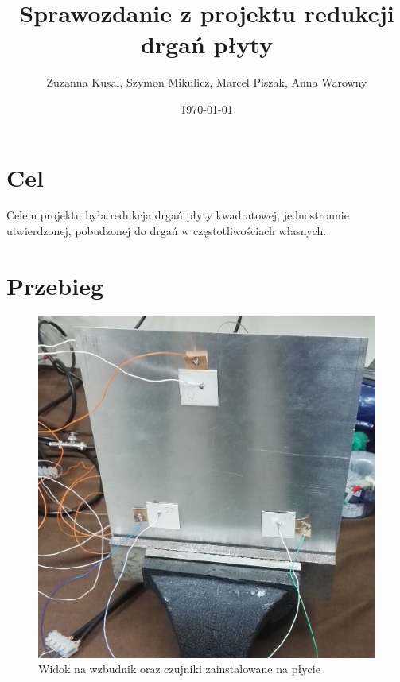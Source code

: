 \documentclass[polish,a4paper,11pt]{mwart}
\date{\today}
\author{Zuzanna Kusal, Szymon Mikulicz, Marcel Piszak, Anna Warowny}
\title{Sprawozdanie z projektu redukcji drgań płyty}
\let\Oldsection\section
\renewcommand{\section}{\FloatBarrier\Oldsection}
\begin{document}
\maketitle

\section{Cel}

Celem projektu była redukcja drgań płyty kwadratowej, jednostronnie
utwierdzonej, pobudzonej do drgań w częstotliwościach własnych.

\section{Przebieg}

\begin{figure}[!tbh]
  \centering
  \includegraphics[width=\textwidth]{./bitgraphics/plate1.jpg}
  \caption{Widok na wzbudnik oraz czujniki zainstalowane na płycie}
  \label{fig:plate1}
\end{figure}
\end{document}
